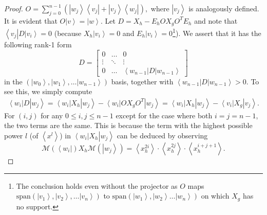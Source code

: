 \documentclass{theoretics}
\begin{document}
\begin{proof}
  $
    O=\sum_{j=0}^{n-1}\left(\left|w_{j}\right\rangle \left\langle v_{j}\right|+\left|v_{j}\right\rangle \left\langle w_{j}\right|\right),
  $
  where $\left|v_{j}\right\rangle $ is analogously defined. It is evident that $O\left|v\right\rangle =\left|w\right\rangle $.
  Let $D=X_{h}-E_{h}OX_{g}O^{T}E_{h}$ and note that $\left\langle v_{j}\right|D\left|v_{i}\right\rangle =0$
  (because $X_{h}\left|v_{i}\right\rangle =0$ and $E_{h}\left|v_{i}\right\rangle =0$\footnote{The conclusion holds even without the projector as $O$ maps $\text{span}(\left|v_{1}\right\rangle ,\left|v_{2}\right\rangle ,\dots\left|v_{n}\right\rangle )$
    to $\text{span}(\left|w_{1}\right\rangle ,\left|w_{2}\right\rangle \dots\left|w_{n}\right\rangle )$
    on which $X_{g}$ has no support.}). We assert that it has the following rank-1 form
  \begin{displaymath}
    D=\left[\begin{array}{cccc}
        0      & \dots  & 0                                                      \\
        \vdots & \ddots & \vdots                                                 \\
        0      & \dots  & \left\langle w_{n-1}\right|D\left|w_{n-1}\right\rangle
      \end{array}\right]
  \end{displaymath}
  in the $\left(\left|w_{0}\right\rangle ,\left|w_{1}\right\rangle ,\dots\left|w_{n-1}\right\rangle \right)$
  basis, together with $\left\langle w_{n-1}\right|D\left|w_{n-1}\right\rangle >0$.
  To see this, we simply compute
  \begin{align*}
    \left\langle w_{i}\right|D\left|w_{j}\right\rangle   =\left\langle w_{i}\right|X_{h}\left|w_{j}\right\rangle -\left\langle w_{i}\right|OX_{g}O^{T}\left|w_{j}\right\rangle  =\left\langle w_{i}\right|X_{h}\left|w_{j}\right\rangle -\left\langle v_{i}\right|X_{g}\left|v_{j}\right\rangle .
  \end{align*}
  For $(i,j)$ for any $0\le i,j\le n-1$ except for the case where
  both $i=j=n-1$, the two terms are the same. This is because the term
  with the highest possible power $l$ (of $\left\langle x^{l}\right\rangle $)
  in $\left\langle w_{i}\right|X_{h}\left|w_{j}\right\rangle $ can
  be deduced by observing
  \begin{equation}
    \mathcal{M}(\left\langle w_{i}\right|)X_{h}\mathcal{M}(\left|w_{j}\right\rangle )=\left\langle x_{h}^{2i}\right\rangle \cdot\left\langle x_{h}^{2j}\right\rangle \cdot\left\langle x_{h}^{i+j+1}\right\rangle .\label{eq:highestPowerInH}

\end{equation}
\end{proof}
\end{document}

